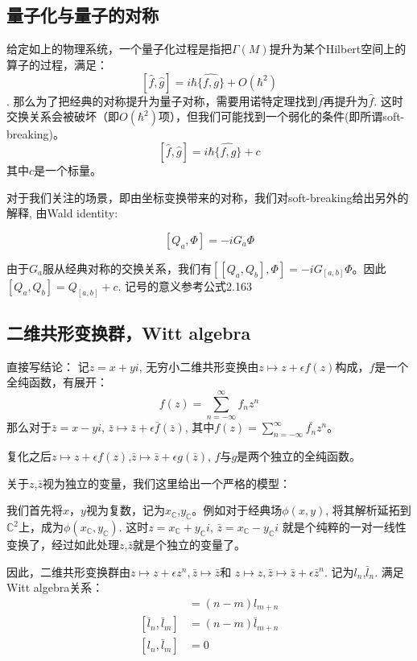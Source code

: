 \subsection{量子化与量子的对称}
给定如上的物理系统，一个量子化过程是指把$\Gamma(M)$提升为某个Hilbert空间上的算子的过程，满足：
\[[\hat f,\hat g]=i\hbar\widehat{\{f,g\}}+O(\hbar^2)\].
那么为了把经典的对称提升为量子对称，需要用诺特定理找到$f$再提升为$\hat f$.
这时交换关系会被破坏（即$O(\hbar^2)$项），但我们可能找到一个弱化的条件(即所谓soft-breaking)。
\[[\hat f,\hat g]=i\hbar\widehat{\{f,g\}}+c\]
其中$c$是一个标量。
\begin{remark}
    对于我们关注的场景，即由坐标变换带来的对称，我们对soft-breaking给出另外的解释,
    由Wald identity:
    
    $$[Q_a,\Phi]=-iG_a\Phi$$

    由于$G_a$服从经典对称的交换关系，我们有$[[Q_a,Q_b],\Phi]=-iG_{[a,b]}\Phi$。因此$[Q_a,Q_b]=Q_{[a,b]}+c$.
    记号的意义参考公式2.163
\end{remark}
\subsection{二维共形变换群，Witt algebra}
直接写结论：
记$z=x+yi$, 无穷小二维共形变换由$z\mapsto z+\epsilon f(z)$构成，$f$是一个全纯函数，有展开：
$$f(z)=\sum_{n=-\infty}^\infty f_nz^n$$
那么对于$\bar z=x-yi$, $\bar z\mapsto \bar z+\epsilon \bar f(\bar z)$, 其中$f(z)=\sum_{n=-\infty}^\infty \bar{f_n}z^{n}$。

复化之后$z\mapsto z+\epsilon f(z)$,$\bar z\mapsto \bar z+\epsilon g(\bar z)$, $f$与$g$是两个独立的全纯函数。
\begin{remark}

关于$z$,$\bar z$视为独立的变量，我们这里给出一个严格的模型：

我们首先将$x$，$y$视为复数，记为$x_{\mathbb{C}}$,$y_{\mathbb{C}}$。例如对于经典场$\phi(x,y)$,
将其解析延拓到$\mathbb{C}^2$上，成为$\phi(x_{\mathbb{C}},y_{\mathbb{C}})$.
这时$z=x_{\mathbb{C}}+y_{\mathbb{C}}i,\,\bar z=x_{\mathbb{C}}-y_{\mathbb{C}}i$
就是个纯粹的一对一线性变换了，经过如此处理$z$,$\bar z$就是个独立的变量了。
\end{remark}
因此，二维共形变换群由$z\mapsto z+\epsilon z^n,\bar z\mapsto \bar z$和
$z\mapsto z,\bar z\mapsto \bar z+\epsilon \bar z^n$. 记为$l_n$,$\bar l_n$.
满足Witt algebra关系：
\begin{align*}
    [l_n,l_m]&=(n-m)l_{m+n}\\
    [\bar l_n,\bar l_m]&=(n-m)\bar l_{m+n}\\
    [l_n,\bar l_m]&=0

\end{align*}
